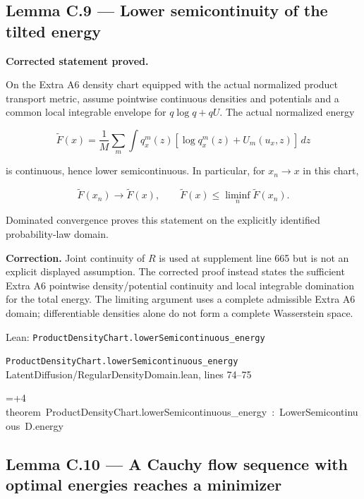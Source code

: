 \documentclass[11pt,a4paper]{report}
\newlength{\leancharwidth}
\newenvironment{leancode}{\par\smallskip\begingroup\ttfamily\footnotesize\raggedright
  \settowidth{\leancharwidth}{M}\setlength{\parskip}{0pt}\setlength{\parindent}{0pt}
  \frenchspacing}{\par\endgroup\smallskip}
\newcommand{\leanline}[2]{\hangindent=\dimexpr#1\leancharwidth+4\leancharwidth\relax
  \hangafter=1\noindent\hspace*{#1\leancharwidth}#2\par}
\newcommand{\leansource}[1]{\par{\footnotesize\color{leanmuted}#1}\par}
\begin{document}
\subsection{\texorpdfstring{Lemma C.9 — Lower semicontinuity of the tilted energy}{Lemma C.9 — Lower semicontinuity of the tilted energy}}


\textbf{Corrected statement proved.}



On the Extra A6 density chart equipped with the
        actual normalized product transport metric, assume pointwise
        continuous densities and potentials and a common local integrable
        envelope for \(q\log q+qU\). The actual normalized energy


        \[\widetilde F(x)=\frac1M\sum_m\int q_x^m(z)
          [\log q_x^m(z)+U_m(u_x,z)]\,dz\]


is continuous, hence lower semicontinuous. In particular, for
        \(x_n\to x\) in this chart,


        \[\widetilde F(x_n)\longrightarrow\widetilde F(x),\qquad
          \widetilde F(x)\le\liminf_n\widetilde F(x_n).\]


Dominated convergence proves this statement on the explicitly
        identified probability-law domain.



\textbf{Correction.} Joint continuity of \(R\) is used at supplement line 665 but is not an explicit displayed assumption. The corrected proof instead states the sufficient Extra A6 pointwise density/\allowbreak{}potential continuity and local integrable domination for the total energy. The limiting argument uses a complete admissible Extra A6 domain; differentiable densities alone do not form a complete Wasserstein space.

\begin{leanbox}{Lean: \texttt{ProductDensityChart.\allowbreak{}lowerSemicontinuous\_\allowbreak{}energy}}
\leansource{\texttt{ProductDensityChart.\allowbreak{}lowerSemicontinuous\_\allowbreak{}energy} \quad LatentDiffusion/\allowbreak{}RegularDensityDomain.lean, lines 74–75}
\begin{leancode}
\leanline{0}{theorem\ ProductDensityChart.lowerSemicontinuous\_energy\ :\ LowerSemicontinuous\ D.energy}
\end{leancode}
\end{leanbox}
\subsection{\texorpdfstring{Lemma C.10 — A Cauchy flow sequence with optimal energies reaches a minimizer}{Lemma C.10 — A Cauchy flow sequence with optimal energies reaches a minimizer}}
\end{document}
